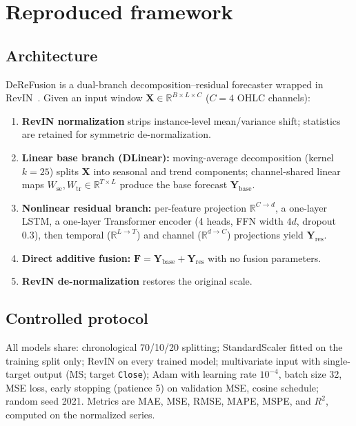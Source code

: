 \documentclass[preprint,12pt]{elsarticle}
\begin{document}
\section{Reproduced framework}
\label{sec:method}

\subsection{Architecture}

DeReFusion is a dual-branch decomposition--residual forecaster wrapped in
RevIN~\cite{kim2022revin}. Given an input window
$\mathbf{X}\in\mathbb{R}^{B\times L\times C}$ ($C=4$ OHLC channels):

\begin{enumerate}
  \item \textbf{RevIN normalization} strips instance-level mean/variance
        shift; statistics are retained for symmetric de-normalization.
  \item \textbf{Linear base branch (DLinear):} moving-average decomposition
        (kernel $k=25$) splits $\mathbf{X}$ into seasonal and trend
        components; channel-shared linear maps
        $W_{\mathrm{se}}, W_{\mathrm{tr}}\in\mathbb{R}^{T\times L}$ produce
        the base forecast $\mathbf{Y}_{\mathrm{base}}$.
  \item \textbf{Nonlinear residual branch:} per-feature projection
        $\mathbb{R}^{C\to d}$, a one-layer LSTM, a one-layer Transformer
        encoder (4 heads, FFN width $4d$, dropout 0.3), then temporal
        ($\mathbb{R}^{L\to T}$) and channel ($\mathbb{R}^{d\to C}$)
        projections yield $\mathbf{Y}_{\mathrm{res}}$.
  \item \textbf{Direct additive fusion:}
        $\mathbf{F}=\mathbf{Y}_{\mathrm{base}}+\mathbf{Y}_{\mathrm{res}}$
        with no fusion parameters.
  \item \textbf{RevIN de-normalization} restores the original scale.
\end{enumerate}

\subsection{Controlled protocol}

All models share: chronological 70/10/20 splitting; StandardScaler fitted on
the training split only; RevIN on every trained model; multivariate input
with single-target output (MS; target \texttt{Close}); Adam with learning
rate $10^{-4}$, batch size 32, MSE loss, early stopping (patience 5) on
validation MSE, cosine schedule; random seed 2021. Metrics are MAE, MSE,
RMSE, MAPE, MSPE, and $R^2$, computed on the normalized series.
\end{document}
